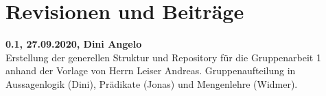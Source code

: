\documentclass[../gruppenarbeit_1.tex]{subfiles}
\begin{document}
\section{Revisionen und Beiträge}

\textbf{0.1, 27.09.2020, Dini Angelo}\\
Erstellung der generellen Struktur und Repository für die Gruppenarbeit 1 anhand
der Vorlage von Herrn Leiser Andreas. Gruppenaufteilung in Aussagenlogik 
(Dini), Prädikate (Jonas) und Mengenlehre (Widmer).
\end{document}
